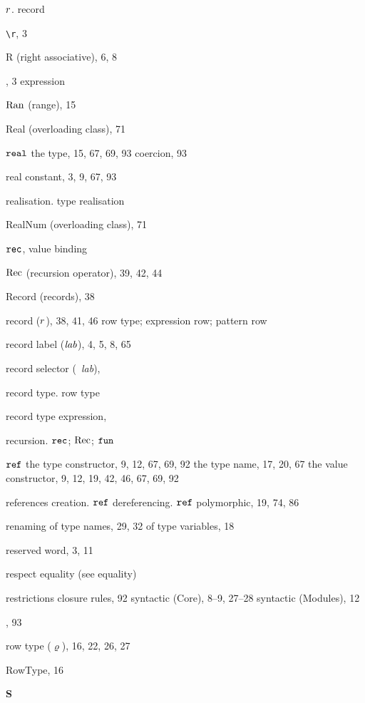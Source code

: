 \begin{theindex}
\item $r$. \see record
\item \verb+\r+, 3
\item R (right associative), 6, 8 
\item \RAISE, 3
\subitem \seealso expression
\item $\mathop{\rm Ran}\nolimits$ (range), 15
\item Real (overloading class), 71
\item $\mbox{\tt real}$
\subitem the type, 15, 67, 69, 93
\subitem coercion, 93
\item real constant, 3, 9, 67, 93
\item realisation. \see type realisation
\item RealNum (overloading class), 71
\item ${\tt rec}$, \recrefs
\subitem \seealso value binding
\item $\mathop{\rm Rec}\nolimits$ (recursion operator), 39, 42, 44
\item Record (records), 38
\item record ($r$), 38, 41, 46
\subitem \seealso row type; expression row; pattern row
\item record label (${\it lab}$), 4, 5, 8, 65
\item record selector (\ml{\#}\ {\it lab}), \hashrefs
\item record type. \see row type
\item record type expression, \bracestyexprefs
\item recursion. \see ${\tt rec}$; $\mathop{\rm Rec}\nolimits$; ${\tt fun}$ 
\item $\mbox{\tt ref}$ 
\subitem the type constructor, 9, 12, 67, 69, 92
\subitem the type name, 17, 20, 67
\subitem the value constructor, 9, 12, 19, 42, 46, 67, 69, 92
\item references
\subitem creation. \see $\mbox{\tt ref}$
\subitem dereferencing. \see $\mbox{\tt ref}$
\subitem polymorphic, 19, 74, 86
\item renaming
\subitem of type names, 29, 32
\subitem of type variables, 18
\item reserved word, 3, 11
\item respect equality (see equality) 
\item restrictions 
\subitem closure rules, 92
\subitem syntactic (Core), 8--9, 27--28
\subitem syntactic (Modules), 12
\item {}, 93
\item row type ($\varrho$), 16, 22, 26, 27
\item RowType, 16
\indexspace

\parbox{65mm}{\hfil{\large\bf S}\hfil}


\end{theindex}
